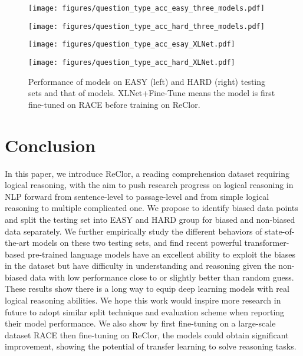 \documentclass{article} \usepackage{iclr2020_conference,times}
\newcommand\xlnetlarge{XLNet\xspace}
\begin{document}
\begin{figure}[htbp]
    \centering
        \begin{minipage}[t]{0.49\textwidth}
            \centering
            \texttt{[image: figures/question\_type\_acc\_easy\_three\_models.pdf]}
        \end{minipage}
        \begin{minipage}[t]{0.49\textwidth}
            \centering
            \texttt{[image: figures/question\_type\_acc\_hard\_three\_models.pdf]}
        \end{minipage}
        \begin{minipage}[t]{0.49\textwidth}
            \centering
            \texttt{[image: figures/question\_type\_acc\_esay\_XLNet.pdf]}
        \end{minipage}
        \begin{minipage}[t]{0.49\textwidth}
            \centering
            \texttt{[image: figures/question\_type\_acc\_hard\_XLNet.pdf]}
        \end{minipage}
    \caption{Performance of models on EASY (left) and HARD (right) testing sets and that of models. \xlnetlarge+Fine-Tune means the model is first fine-tuned on RACE before training on ReClor.}
    \label{fig:easy_and_hard_questioni_type_acc}
\end{figure}
    
    
\section{Conclusion}
In this paper, we introduce ReClor, a reading comprehension dataset requiring logical reasoning, with the aim to push research progress on logical reasoning in NLP forward from sentence-level to passage-level and from simple logical reasoning to multiple complicated one. We propose to identify biased data points and split the testing set into EASY and HARD group for biased and non-biased data separately. We further empirically study the different behaviors of state-of-the-art models on these two testing sets, and find recent powerful transformer-based pre-trained language models have an excellent ability to exploit the biases in the dataset but have difficulty in understanding and reasoning given the non-biased data with low performance close to or slightly better than random guess. These results show there is a long way to equip deep learning models with real logical reasoning abilities. We hope this work would inspire more research in future to adopt similar split technique and evaluation scheme when reporting their model performance. We also show by first fine-tuning on a large-scale dataset RACE then fine-tuning on ReClor, the models could obtain significant improvement, showing the potential of transfer learning to solve reasoning tasks. 
\end{document}
